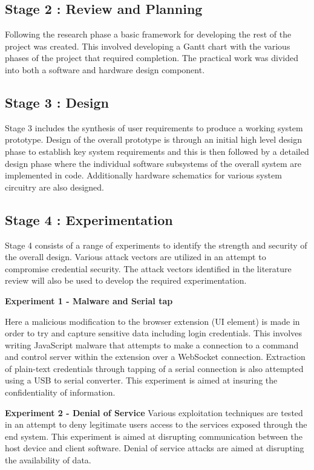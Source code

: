 \subsection{Stage 2 : Review and Planning}

Following the research phase a basic framework for developing the rest of the project was created. This involved developing a Gantt chart with the various phases of the project that required completion. The practical work was divided into both a software and hardware design component.

\subsection{Stage 3 : Design}
Stage 3 includes the synthesis of user requirements to produce a working system prototype. Design of the overall prototype is through an initial high level design phase to establish key system requirements and this is then followed by a detailed design phase where the individual software subsystems of the overall system are implemented in code. Additionally hardware schematics for various system circuitry are also designed. 

\subsection{Stage 4 : Experimentation}

Stage 4 consists of a range of experiments to identify the strength and security of the overall design. Various attack vectors are utilized in an attempt to compromise credential security. The attack vectors identified in the literature review will also be used to develop the required experimentation.

\textbf{Experiment 1 - Malware and Serial tap}

Here a malicious modification to the browser extension (UI element) is made in order to try and capture sensitive data including login credentials. This involves writing JavaScript malware that attempts to make a connection to a command and control server within the extension over a WebSocket connection. Extraction of plain-text credentials through tapping of a serial connection is also attempted using a USB to serial converter. This experiment is aimed at insuring the confidentiality of information.

\textbf{Experiment 2 - Denial of Service}
Various exploitation techniques are tested in an attempt to deny legitimate users access to the services exposed through the end system. This experiment is aimed at disrupting communication between the host device and client software. Denial of service attacks are aimed at disrupting the availability of data.

